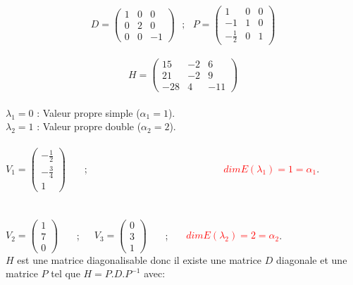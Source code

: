 \documentclass[a4paper,12pt,french]{article}
\begin{document}
	\[ D=\begin{pmatrix}
		1 & 0 & 0  \\
		0 & 2 & 0\\
		0 & 0 & -1
		
	\end{pmatrix} ~~~;~~~P=\begin{pmatrix}
		1 & 0 & 0  \\
		-1 & 1 & 0\\
		-\frac{1}{2} & 0 & 1
		
	\end{pmatrix}
	\]
	~~~ \\
	\[ H=\begin{pmatrix}
		15 & -2 & 6  \\
		21 & -2 & 9\\
		-28 & 4 & -11
		
	\end{pmatrix}
	\]
	~~~ \\
	$\lambda_{1}=0$ : Valeur propre simple ($\alpha_{1}=1$).\\
	$\lambda_{2}=1$ : Valeur propre double ($\alpha_{2}=2$).\\
	~~~ \\
	$V_{1}=\begin{pmatrix}
		-\frac{1}{2}  \\
		-\frac{3}{4} \\
		1
		
		
	\end{pmatrix}$ ~~~;~~~~~~~~~~~~~~~~~~~~~~~~~~~ \textcolor{red}{$dim E(\lambda_{1})=1=\alpha_{1}$}.\\
	~~~ \\
	~~~ \\
	$V_{2}=\begin{pmatrix}
		1  \\
		7  \\
		0
		
	\end{pmatrix}$ ~~~;~~~$V_{3}=\begin{pmatrix}
		0  \\
		3  \\
		1
		
	\end{pmatrix}$ ~~~;~~~ \textcolor{red}{$dim E(\lambda_{2})=2=\alpha_{2}$}.\\
	
	$H$ est une matrice diagonalisable donc il existe une matrice $D$ diagonale et une matrice $P$ tel que $H=P.D.P^{-1}$ avec:\\
	
\end{document}

